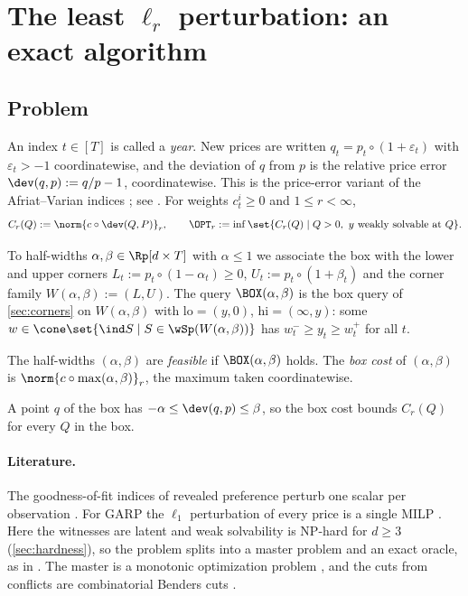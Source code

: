 \section{The least $\ell_r$ perturbation: an exact algorithm}\label{sec:lp}

\subsection{Problem}
An index $t\in[T]$ is called a \emph{year}. New prices are written $q_t=p_t\circ(1+\varepsilon_t)$ with $\varepsilon_t>-1$ coordinatewise, and the deviation of $q$ from $p$ is the relative price error $\dev(q,p):=q/p-1$, coordinatewise. This is the price-error variant of the Afriat--Varian indices \citep{Varian1985}; see \citet{DemuynckRehbeck2023}. For weights $c^i_t\ge0$ and $1\le r<\infty$,
\[
C_r(Q):=\norm{c\circ\dev(Q,P)}_r,\qquad\OPT_r:=\inf\set{C_r(Q)\mid Q>0,\ y\text{ weakly solvable at }Q}.
\]

To half-widths $\alpha,\beta\in\Rp[d\times T]$ with $\alpha\le1$ we associate the box with the lower and upper corners $L_t:=p_t\circ(1-\alpha_t)\ge0$, $U_t:=p_t\circ(1+\beta_t)$ and the corner family $W(\alpha,\beta):=(L,U)$. The query $\BOX(\alpha,\beta)$ is the box query of \cref{sec:corners} on $W(\alpha,\beta)$ with $\mathrm{lo}=(y,0)$, $\mathrm{hi}=(\infty,y)$: some $w\in\cone\set{\ind S\mid S\in\wSp(W(\alpha,\beta))}$ has $w^-_t\ge y_t\ge w^+_t$ for all $t$.

\begin{definition}\label{def:boxfeasible}
The half-widths $(\alpha,\beta)$ are \emph{feasible} if $\BOX(\alpha,\beta)$ holds. The \emph{box cost} of $(\alpha,\beta)$ is $\norm{c\circ\max(\alpha,\beta)}_r$, the maximum taken coordinatewise.
\end{definition}
A point $q$ of the box has $-\alpha\le\dev(q,p)\le\beta$, so the box cost bounds $C_r(Q)$ for every $Q$ in the box.

\paragraph{Literature.} The goodness-of-fit indices of revealed preference perturb one scalar per observation \citep{Cherchye2014}. For GARP the $\ell_1$ perturbation of every price is a single MILP \citep{DemuynckRehbeck2023}. Here the witnesses are latent and weak solvability is NP-hard for $d\ge3$ (\cref{sec:hardness}), so the problem splits into a master problem and an exact oracle, as in \citet{DeanMartin2016}. The master is a monotonic optimization problem \citep{Tuy2000,TuyAlKhayyalThach2005}, and the cuts from conflicts are combinatorial Benders cuts \citep{CodatoFischetti2006,FischettiSalvagninZanette2010}.

